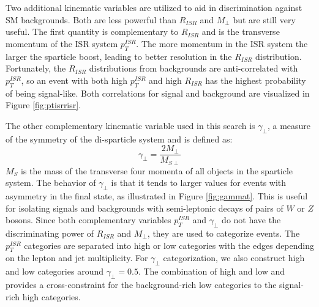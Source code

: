 

Two additional kinematic variables are utilized to aid in discrimination against SM backgrounds. Both are less powerful than $R_{ISR}$ and $M_\perp$ but are still very useful. The first quantity is complementary to $R_{ISR}$ and is the transverse momentum of the ISR system $p_T^{ISR}$. The more momentum in the ISR system the larger the sparticle boost, leading to better resolution in the $R_{ISR}$ distribution. Fortunately, the $R_{ISR}$ distributions from backgrounds are anti-correlated with $p_T^{ISR}$, so an event with both high  $p_T^{ISR}$ and high $R_{ISR}$ has the highest probability of being signal-like. Both correlations for signal and background are visualized in Figure \ref{fig:ptisrrisr}.


 The other complementary kinematic variable used in this search is $\gamma_\perp$,  a measure of the symmetry of the di-sparticle system and is defined as:
\begin{equation}
\gamma_\perp = \frac{2M_\perp}{M_{S\perp}}
\end{equation}
$M_S$ is the mass of the transverse four momenta of all objects in the sparticle system. The behavior of $\gamma_\perp$ is that it tends to larger values for events with asymmetry in the final state, as illustrated in Figure \ref{fig:gammat}. This is useful for isolating signals and backgrounds with semi-leptonic decays of pairs of $W$ or $Z$ bosons. Since both complementary variables $p_T^{ISR}$ and $\gamma_\perp$ do not have the discriminating power of $R_{ISR}$ and $M_\perp$, they are used to categorize events. The $p_T^{ISR}$ categories are separated into high or low categories with the edges depending on the lepton and jet multiplicity. For $\gamma_\perp$ categorization, we also construct high and low categories around $\gamma_\perp= 0.5$. The combination of high and low and provides a cross-constraint for the background-rich low categories to the signal-rich high categories.

